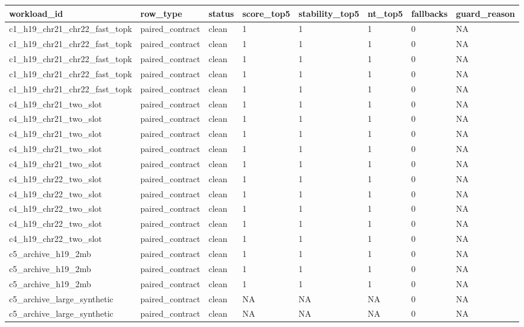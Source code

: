 \begin{tabular}{llllllll}
\toprule
workload\_id & row\_type & status & score\_top5 & stability\_top5 & nt\_top5 & fallbacks & guard\_reason \\
\midrule
c1\_h19\_chr21\_chr22\_fast\_topk & paired\_contract & clean & 1 & 1 & 1 & 0 & NA \\
c1\_h19\_chr21\_chr22\_fast\_topk & paired\_contract & clean & 1 & 1 & 1 & 0 & NA \\
c1\_h19\_chr21\_chr22\_fast\_topk & paired\_contract & clean & 1 & 1 & 1 & 0 & NA \\
c1\_h19\_chr21\_chr22\_fast\_topk & paired\_contract & clean & 1 & 1 & 1 & 0 & NA \\
c1\_h19\_chr21\_chr22\_fast\_topk & paired\_contract & clean & 1 & 1 & 1 & 0 & NA \\
c4\_h19\_chr21\_two\_slot & paired\_contract & clean & 1 & 1 & 1 & 0 & NA \\
c4\_h19\_chr21\_two\_slot & paired\_contract & clean & 1 & 1 & 1 & 0 & NA \\
c4\_h19\_chr21\_two\_slot & paired\_contract & clean & 1 & 1 & 1 & 0 & NA \\
c4\_h19\_chr21\_two\_slot & paired\_contract & clean & 1 & 1 & 1 & 0 & NA \\
c4\_h19\_chr21\_two\_slot & paired\_contract & clean & 1 & 1 & 1 & 0 & NA \\
c4\_h19\_chr22\_two\_slot & paired\_contract & clean & 1 & 1 & 1 & 0 & NA \\
c4\_h19\_chr22\_two\_slot & paired\_contract & clean & 1 & 1 & 1 & 0 & NA \\
c4\_h19\_chr22\_two\_slot & paired\_contract & clean & 1 & 1 & 1 & 0 & NA \\
c4\_h19\_chr22\_two\_slot & paired\_contract & clean & 1 & 1 & 1 & 0 & NA \\
c4\_h19\_chr22\_two\_slot & paired\_contract & clean & 1 & 1 & 1 & 0 & NA \\
c5\_archive\_h19\_2mb & paired\_contract & clean & 1 & 1 & 1 & 0 & NA \\
c5\_archive\_h19\_2mb & paired\_contract & clean & 1 & 1 & 1 & 0 & NA \\
c5\_archive\_h19\_2mb & paired\_contract & clean & 1 & 1 & 1 & 0 & NA \\
c5\_archive\_large\_synthetic & paired\_contract & clean & NA & NA & NA & 0 & NA \\
c5\_archive\_large\_synthetic & paired\_contract & clean & NA & NA & NA & 0 & NA \\

\end{tabular}
